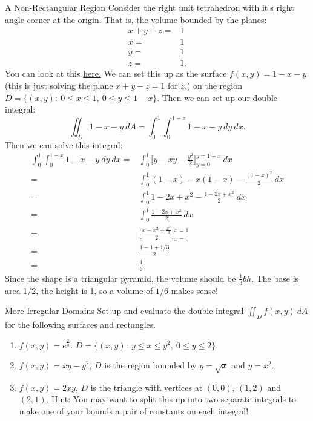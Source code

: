 \begin{example}{A Non-Rectangular Region}
Consider the right unit tetrahedron with it's right angle corner at the origin. That is, the volume bounded by the planes: \begin{align*}
x+y+z=&1\\
x=&1\\
y=&1\\
z=&1.
\end{align*}
You can look at this \href{https://www.geogebra.org/3d/bndxps3v}{here.} We can set this up as the surface $f(x,y)=1-x-y$ (this is just solving the plane $x+y+z=1$ for $z$.) on the region $D=\{(x,y):\ 0\leq x\leq 1,\ 0\leq y \leq 1-x \}.$ Then we can set up our double integral:
$$\iint_D 1-x-y\ dA=\int_{0}^1\int_0^{1-x} 1-x-y \ dy\ dx. $$
Then we can solve this integral:
\begin{align*}
\int_{0}^1\int_0^{1-x} 1-x-y \ dy\ dx=&\int_0^1\Bigg[y-xy-\frac{y^2}{2}\Bigg]_{y=0}^{y=1-x}\ dx\\
=&\int_{0}^1 (1-x)-x(1-x)-\frac{(1-x)^2}{2} \ dx\\
=&\int_0^1 1-2x+x^2-\frac{1-2x+x^2}{2} \ dx\\
=&\int_0^1 \frac{1-2x+x^2}{2}\ dx\\
=&\Bigg[\frac{x-x^2+\frac{x^3}{3}}{2}\Bigg]_{x=0}^{x=1}\\
=&\frac{1-1+1/3}{2}\\
=&\frac{1}{6}
\end{align*}
Since the shape is a triangular pyramid, the volume should be $\frac{1}{3}bh$. The base is area 1/2, the height is 1, so a volume of $1/6$ makes sense!
\end{example}

\begin{exercise}{More Irregular Domains}
Set up and evaluate the double integral $\iint_D f(x,y)\ dA$ for the following surfaces and rectangles.
\vspace{1em}
\begin{enumerate}
\item $f(x,y)=e^{\frac{x}{y}}$. $D=\{(x,y):\ y\leq x\leq y^2 ,\ 0\leq y\leq 2 \}$.
\vspace{1em}
\item $f(x,y)=xy-y^2$, $D$ is the region bounded by $y=\sqrt{x}$ and $y=x^2$.
\vspace{1em}
\item $f(x,y)=2xy$, $D$ is the triangle with vertices at $(0,0)$, $(1,2)$ and $(2,1)$. Hint: You may want to split this up into two separate integrals to make one of your bounds a pair of constants on each integral!
\end{enumerate}
\end{exercise}

